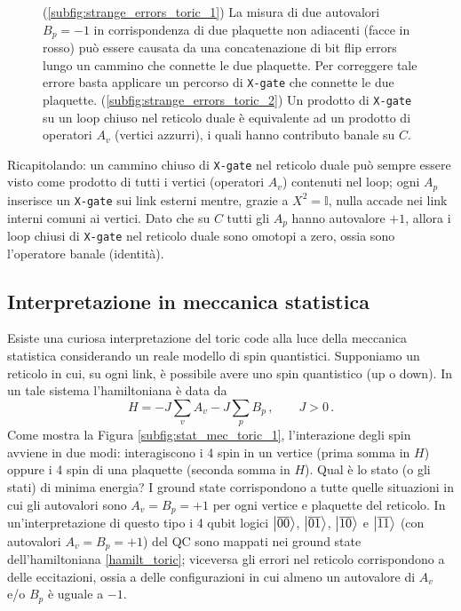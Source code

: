 \begin{figure}[!ht]
	\caption{(\ref{subfig:strange_errors_toric_1}) La misura di due autovalori $B_p = -1$ in corrispondenza di due plaquette non adiacenti (facce in rosso) può essere causata da una concatenazione di bit flip errors lungo un cammino che connette le due plaquette. Per correggere tale errore basta applicare un percorso di \texttt{X-gate} che connette le due plaquette. (\ref{subfig:strange_errors_toric_2}) Un prodotto di \texttt{X-gate} su un loop chiuso nel reticolo duale è equivalente ad un prodotto di operatori $A_v$ (vertici azzurri), i quali hanno contributo banale su $C$.}
    \label{fig:strange_errors_toric}
\end{figure}

\noindent Ricapitolando: un cammino chiuso di \texttt{X-gate} nel reticolo duale può sempre essere visto come prodotto di tutti i vertici (operatori $A_v$) contenuti nel loop; ogni $A_p$ inserisce un \texttt{X-gate} sui link esterni mentre, grazie a $X^2 = \mathbb{I}$, nulla accade nei link interni comuni ai vertici. Dato che su $C$ tutti gli $A_p$ hanno autovalore $+1$, allora i loop chiusi di \texttt{X-gate} nel reticolo duale sono omotopi a zero, ossia sono l'operatore banale (identità). 

\subsection{Interpretazione in meccanica statistica}
Esiste una curiosa interpretazione del toric code alla luce della meccanica statistica considerando un reale modello di spin quantistici. Supponiamo un reticolo in cui, su ogni link, è possibile avere uno spin quantistico (up o down). In un tale sistema l'hamiltoniana è data da 
\begin{equation}\label{hamilt_toric}
    H = - J \sum_v A_v - J \sum_p B_p \, , \qquad J > 0 \, .
\end{equation}
Come mostra la Figura \ref{subfig:stat_mec_toric_1}, l'interazione degli spin avviene in due modi: interagiscono i 4 spin in un vertice (prima somma in $H$) oppure i 4 spin di una plaquette (seconda somma in $H$). Qual è lo stato (o gli stati) di minima energia? I ground state corrispondono a tutte quelle situazioni in cui gli autovalori sono $A_v = B_p = +1$ per ogni vertice e plaquette del reticolo. In un'interpretazione di questo tipo i 4 qubit logici $\ket{\overline{00}}$, $\ket{\overline{01}}$, $\ket{\overline{10}}$ e $\ket{\overline{11}}$ (con autovalori $A_v = B_p = +1$) del QC sono mappati nei ground state dell'hamiltoniana \eqref{hamilt_toric}; viceversa gli errori nel reticolo corrispondono a delle eccitazioni, ossia a delle configurazioni in cui almeno un autovalore di $A_v$ e/o $B_p$ è uguale a $-1$. 

